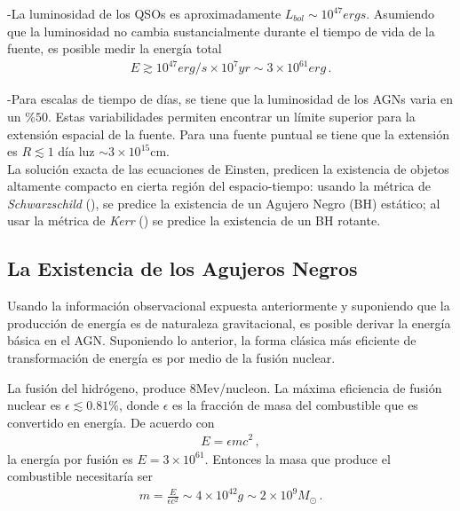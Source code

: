 -La luminosidad de los QSOs es aproximadamente $L_{bol}\sim 10^{47}ergs$. Asumiendo que la luminosidad no cambia sustancialmente durante el tiempo de vida de la fuente, es posible medir la energía total
\begin{align}
E \gtrsim 10^{47} erg/s \times 10^{7}yr \sim 3\times 10^{61}erg\,.
\end{align}

-Para escalas de tiempo de días, se tiene que la luminosidad de los AGNs varia en un $\% 50$. Estas variabilidades permiten encontrar un límite superior para la extensión espacial de la fuente. Para una fuente puntual se tiene que la extensión es $R \lesssim 1$ día luz $\sim3\times10^{15}$cm.\\

La solución exacta de las ecuaciones de Einsten, predicen la existencia de objetos altamente compacto en cierta región del espacio-tiempo: usando la métrica de {\it{Schwarzschild}} (), se predice la existencia de un Agujero Negro (BH) estático; al usar la métrica de {\it{Kerr}} () se predice la existencia de un BH rotante. 

	\subsection{La Existencia de los Agujeros Negros}
	\label{subsec:Why_a_BH}

Usando la información observacional expuesta anteriormente y suponiendo que la producción de energía es de naturaleza gravitacional, es posible derivar la energía básica en el AGN. Suponiendo lo anterior, la forma clásica más eficiente de transformación de energía es por medio de la fusión nuclear. 

La fusión del hidrógeno, produce 8Mev/nucleon. La máxima eficiencia de fusión nuclear es $\epsilon \lesssim 0.81 \%$, donde $\epsilon$ es la fracción de masa del combustible que es convertido en energía. De acuerdo con 
\begin{align}
E=\epsilon mc^{2}\,,
\end{align}
%
la energía por fusión es $E=3\times10^{61}$. Entonces la masa que produce el combustible necesitaría ser 
\begin{align}
m=\frac{E}{\epsilon c^{2}} \sim 4\times10^{42}g\sim 2\times10^{9}M_{\odot}\,.
\end{align}


